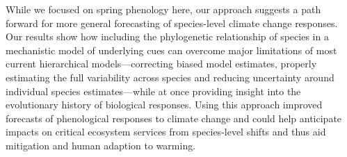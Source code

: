 \documentclass[11pt]{article}
\begin{document}

While we focused on spring phenology here, our approach suggests a path forward for more general forecasting of species-level climate change responses. Our results show how including the phylogenetic relationship of species in a mechanistic model of underlying cues can overcome major limitations of most current hierarchical models---correcting biased model estimates, properly estimating the full variability across species and reducing uncertainty around individual species estimates---while at once providing insight into the evolutionary history of biological responses. Using this approach improved forecasts of phenological responses to climate change and could help anticipate impacts on critical ecosystem services from species-level shifts and thus aid mitigation and human adaption to warming. %




\clearpage
\end{document}
